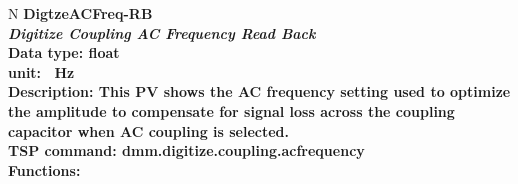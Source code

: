 \documentclass[openany]{article}
\begin{document}
		\begin{tabular}{N}
			\hline
			\bfseries DigtzeACFreq-RB\label{pv:digtzeacfreq-rb} \\ \hline
			\emph{Digitize Coupling AC Frequency Read Back} \\
			Data type: float \\
			unit: \SI{}{\hertz} \\
			Description: This PV shows the AC frequency setting used to optimize the amplitude to compensate for signal loss across the coupling capacitor when AC coupling is selected. \\
			TSP command: dmm.digitize.coupling.acfrequency \\
			Functions: \\
			\arrayrulecolor{\FuncTableBorderColor}

		\end{tabular}
\end{document}
